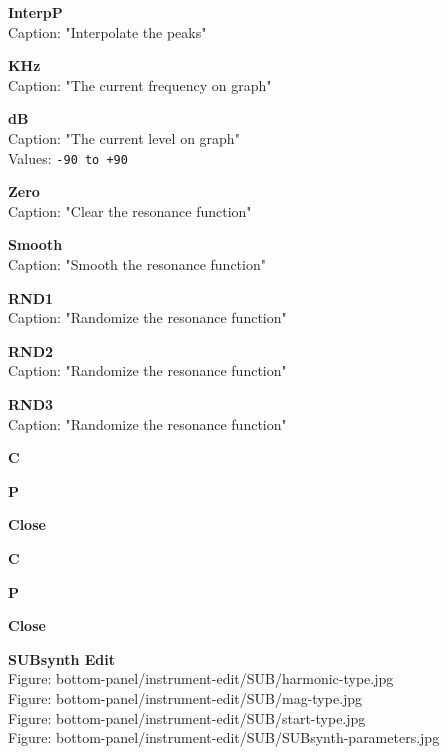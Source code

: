 \documentclass[
 11pt,
 twoside,
 a4paper,
 headinclude,
 footinclude,
 final                                 %
]{article}
\begin{document}
\begin{enumber}
\begin{enumber}
\begin{enumber}
\begin{enumber}
               \item \textbf{InterpP} \\
                  Caption: "Interpolate the peaks"
               \item \textbf{KHz} \\
                  Caption: "The current frequency on graph"
               \item \textbf{dB} \\
                  Caption: "The current level on graph" \\
                  Values: \texttt{-90 to +90}
               \item \textbf{Zero} \\
                  Caption: "Clear the resonance function"
               \item \textbf{Smooth} \\
                  Caption: "Smooth the resonance function"
               \item \textbf{RND1} \\
                  Caption: "Randomize the resonance function"
               \item \textbf{RND2} \\
                  Caption: "Randomize the resonance function"
               \item \textbf{RND3} \\
                  Caption: "Randomize the resonance function"
               \item \textbf{C}
               \item \textbf{P}
               \item \textbf{Close}
            \end{enumber}

         \item \textbf{C}
         \item \textbf{P}
         \item \textbf{Close}
      \end{enumber}

      \item \textbf{SUBsynth Edit} \\
         Figure: bottom-panel/instrument-edit/SUB/harmonic-type.jpg \\
         Figure: bottom-panel/instrument-edit/SUB/mag-type.jpg \\
         Figure: bottom-panel/instrument-edit/SUB/start-type.jpg \\
         Figure: bottom-panel/instrument-edit/SUB/SUBsynth-parameters.jpg


\end{enumber}
\end{enumber}
\end{document}
